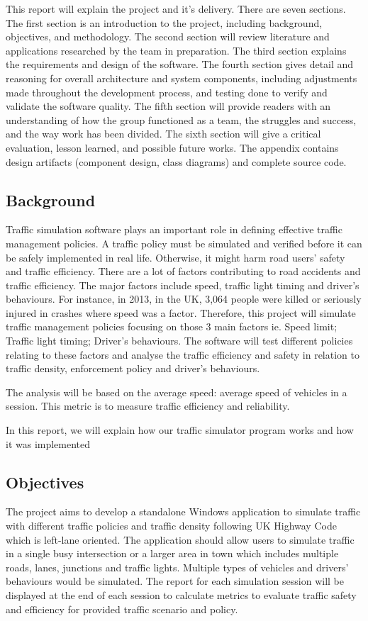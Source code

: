 \documentclass[11pt]{article}
\begin{document}
This report will explain the project and it's delivery. There are seven sections. The first section is an introduction to the project, including background, objectives, and methodology. The second section will review literature and applications researched by the team in preparation. The third section explains the requirements and design of the software. The fourth section gives detail and reasoning for overall architecture and system components, including adjustments made throughout the development process, and testing done to verify and validate the software quality. The fifth section will provide readers with an understanding of how the group functioned as a team, the struggles and success, and the way work has been divided. The sixth section will give a critical evaluation, lesson learned, and possible future works. The appendix contains design artifacts (component design, class diagrams) and complete source code.

\subsection{Background}
Traffic simulation software plays an important role in defining effective traffic management policies. A traffic policy must be simulated and verified before it can be safely implemented in real life. Otherwise, it might harm road users’ safety and traffic efficiency. There are a lot of factors contributing to road accidents and traffic efficiency. The major factors include speed, traffic light timing and driver’s behaviours. For instance, in 2013, in the UK, 3,064 people were killed or seriously injured in crashes where speed was a factor.
Therefore, this project will simulate traffic management policies focusing on those 3 main factors ie. Speed limit; Traffic light timing; Driver's behaviours. The software will test different policies relating to these factors and analyse the traffic efficiency and safety in relation to traffic density, enforcement policy and driver's behaviours.

The analysis will be based on the average speed: average speed of vehicles in a session. This metric is to measure traffic efficiency and reliability.

In this report, we will explain how our traffic simulator program works and how it was implemented
	


\subsection{Objectives}
The project aims to develop a standalone Windows application to simulate traffic with different traffic policies and traffic density following UK Highway Code which is left-lane oriented. The application should allow users to simulate traffic in a single busy intersection or a larger area in town which includes multiple roads, lanes, junctions and traffic lights. Multiple types of vehicles and drivers' behaviours would be simulated. The report for each simulation session will be displayed at the end of each session to calculate metrics to evaluate traffic safety and efficiency for provided traffic scenario and policy.
\end{document}
